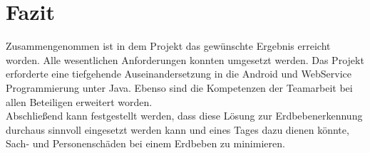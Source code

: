 \section{Fazit}
Zusammengenommen ist in dem Projekt das gewünschte Ergebnis erreicht worden. Alle wesentlichen Anforderungen konnten umgesetzt werden. Das Projekt erforderte eine tiefgehende Auseinandersetzung in die Android und WebService Programmierung unter Java. Ebenso sind die Kompetenzen der Teamarbeit bei allen Beteiligen erweitert worden.\\
Abschließend kann festgestellt werden, dass diese Lösung zur Erdbebenerkennung durchaus sinnvoll eingesetzt werden kann und eines Tages dazu dienen könnte, Sach- und Personenschäden bei einem Erdbeben zu minimieren.